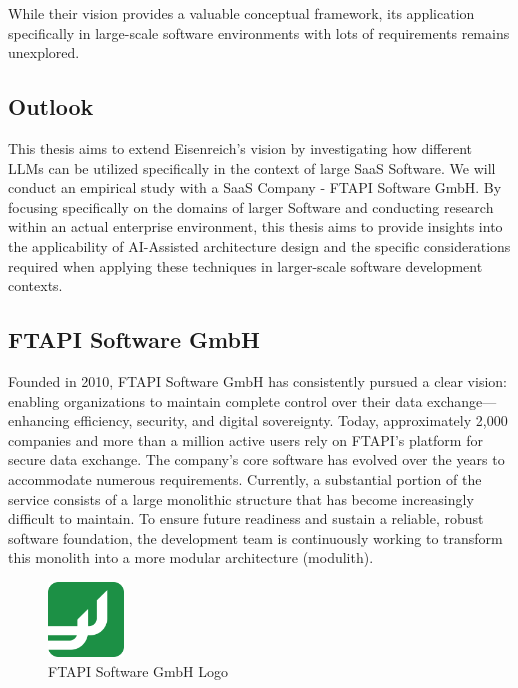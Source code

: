 While their vision provides a valuable conceptual framework, its application specifically in large-scale software environments with lots of requirements remains unexplored. 

\subsection{Outlook}
This thesis aims to extend Eisenreich's vision by investigating how different LLMs can be utilized specifically in the context of large SaaS Software. We will conduct an empirical study with a SaaS Company - FTAPI Software GmbH. By focusing specifically on the domains of larger Software and conducting research within an actual enterprise environment, this thesis aims to provide insights into the applicability of AI-Assisted architecture design and the specific considerations required when applying these techniques in larger-scale software development contexts.

\subsection{FTAPI Software GmbH}
Founded in 2010, FTAPI Software GmbH has consistently pursued a clear vision: enabling organizations to maintain complete control over their data exchange—enhancing efficiency, security, and digital sovereignty. Today, approximately 2,000 companies and more than a million active users rely on FTAPI's platform for secure data exchange.
The company's core software has evolved over the years to accommodate numerous requirements. Currently, a substantial portion of the service consists of a large monolithic structure that has become increasingly difficult to maintain. To ensure future readiness and sustain a reliable, robust software foundation, the development team is continuously working to transform this monolith into a more modular architecture (modulith).

\begin{figure}[H]  %
  \centering
  \includegraphics[height=2cm]{logos/FTAPI-icon.png}  %
  \caption{FTAPI Software GmbH Logo}
  \label{fig:example}  %
\end{figure}

